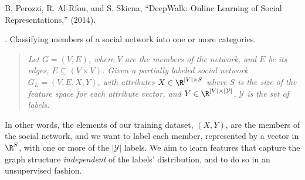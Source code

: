 \documentclass[11pt]{article}
\begin{document}
\vspace{-1em}
{\footnotesize B. Perozzi, R. Al-Rfou, and S. Skiena, ``DeepWalk: Online Learning of Social Representations,'' (2014).}

\p {}. Classifying members of a social network into one or more categories. 
\vspace{-1em}
\begin{quote}
	{\itshape Let $G = (V, E)$, where $V$ are the members of the network, and $E$ be its edges, $E \subseteq (V \times V)$. Given a partially labeled social network $G_L = (V, E, X, Y)$, with attributes $X \in \R^{|V| \times S}$ where $S$ is the size of the feature space for each attribute vector, and $Y \in \R^{|V| \times |\mathcal{Y}|}$, $\mathcal{Y}$ is the set of labels.}
\end{quote}
\vspace{-1em}
In other words, the elements of our training dataset, $(X, Y)$, are the members of the social network, and we want to label each member, represented by a vector in $\R^S$, with one or more of the $|\mathcal{Y}|$ labels. We aim to learn features that capture the graph structure \textit{independent} of the labels' distribution, and to do so in an unsupervised fashion.
\end{document}

